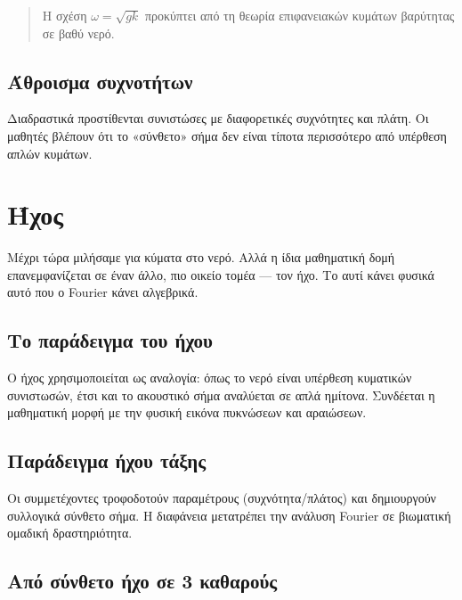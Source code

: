 \documentclass[a4paper, 11pt]{article}
\begin{document}
\begin{quote}
Η σχέση \(\omega = \sqrt{gk}\) προκύπτει από τη θεωρία επιφανειακών
κυμάτων βαρύτητας σε βαθύ νερό.
\end{quote}

\subsection{Άθροισμα
συχνοτήτων}\label{ux3acux3b8ux3c1ux3bfux3b9ux3c3ux3bcux3b1-ux3c3ux3c5ux3c7ux3bdux3bfux3c4ux3aeux3c4ux3c9ux3bd}

Διαδραστικά προστίθενται συνιστώσες με διαφορετικές συχνότητες και
πλάτη. Οι μαθητές βλέπουν ότι το «σύνθετο» σήμα δεν είναι τίποτα
περισσότερο από υπέρθεση απλών κυμάτων.

\section{Ήχος}\label{ux3aeux3c7ux3bfux3c2}

Μέχρι τώρα μιλήσαμε για κύματα στο νερό. Αλλά η ίδια μαθηματική δομή
επανεμφανίζεται σε έναν άλλο, πιο οικείο τομέα --- τον ήχο. Το αυτί
κάνει φυσικά αυτό που ο Fourier κάνει αλγεβρικά.

\subsection{Το παράδειγμα του
ήχου}\label{ux3c4ux3bf-ux3c0ux3b1ux3c1ux3acux3b4ux3b5ux3b9ux3b3ux3bcux3b1-ux3c4ux3bfux3c5-ux3aeux3c7ux3bfux3c5}

Ο ήχος χρησιμοποιείται ως αναλογία: όπως το νερό είναι υπέρθεση
κυματικών συνιστωσών, έτσι και το ακουστικό σήμα αναλύεται σε απλά
ημίτονα. Συνδέεται η μαθηματική μορφή με την φυσική εικόνα πυκνώσεων και
αραιώσεων.

\subsection{Παράδειγμα ήχου
τάξης}\label{ux3c0ux3b1ux3c1ux3acux3b4ux3b5ux3b9ux3b3ux3bcux3b1-ux3aeux3c7ux3bfux3c5-ux3c4ux3acux3beux3b7ux3c2}

Οι συμμετέχοντες τροφοδοτούν παραμέτρους (συχνότητα/πλάτος) και
δημιουργούν συλλογικά σύνθετο σήμα. Η διαφάνεια μετατρέπει την ανάλυση
Fourier σε βιωματική ομαδική δραστηριότητα.

\subsection{Από σύνθετο ήχο σε 3
καθαρούς}\label{ux3b1ux3c0ux3cc-ux3c3ux3cdux3bdux3b8ux3b5ux3c4ux3bf-ux3aeux3c7ux3bf-ux3c3ux3b5-3-ux3baux3b1ux3b8ux3b1ux3c1ux3bfux3cdux3c2}
\end{document}
